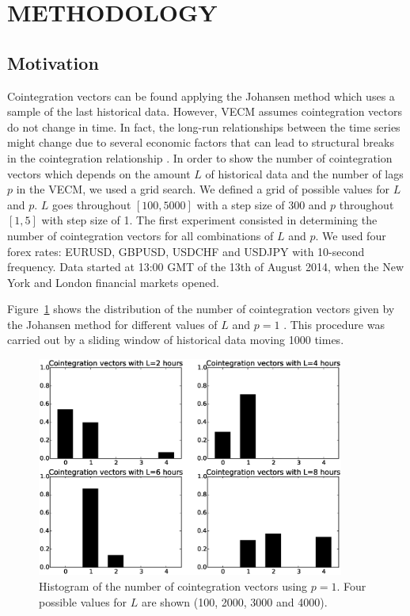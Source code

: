 \section{\uppercase{Methodology}} \label{sec:methodology}
\subsection{Motivation} \label{sec:proposal}

Cointegration vectors can be found applying the Johansen method which uses a
sample of the last historical data. However, VECM assumes cointegration vectors do not change in time.
In fact, the long-run relationships between the time series might change due to
several economic factors that can lead to structural breaks in the cointegration
relationship \cite{gregoryETal1996}. 
In order to show the number of cointegration vectors which depends on 
the amount $L$ of historical data and the number of lags $p$ in the VECM, we used a grid search. We defined a grid of possible values for $L$ and $p$. $L$ goes throughout $[100,5000]$ with a step size of 300 and $p$  throughout $[1,5]$ with step size of 1. The first experiment consisted in determining the number of cointegration vectors for all combinations of $L$ and $p$.
We used four forex rates: EURUSD, GBPUSD, USDCHF and USDJPY with 10-second frequency. Data started at 13:00 GMT of the 13th of August 2014,
when the New York and London financial markets opened.

Figure~\ref{fig:hists} shows the distribution of the number of cointegration vectors 
given by the Johansen method for different values of $L$ and $p=1$ . This procedure was carried out by a sliding window of historical data moving 1000 times.



\begin{figure}[!h]
  \centering
  \includegraphics[width=0.9\textwidth]{img/histCointVectors-offset20520-p-1-freq-10s}
  \caption{Histogram of the number of cointegration vectors using $p=1$. Four
  possible values for $L$ are shown (100, 2000, 3000 and 4000).}
  \label{fig:hists}
\end{figure}


